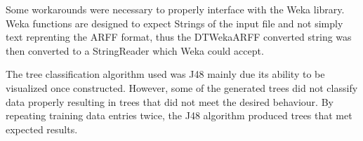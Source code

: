 Some workarounds were necessary to properly interface with the Weka library.  Weka functions are
designed to expect Strings of the input file and not simply text reprenting the ARFF format, thus
the DTWekaARFF converted string was then converted to a StringReader which Weka could accept.

The tree classification algorithm used was J48 mainly due its ability to be visualized once constructed.
However, some of the generated trees did not classify data properly resulting in trees that did not
meet the desired behaviour.  By repeating training data entries twice, the J48 algorithm produced
trees that met expected results. 